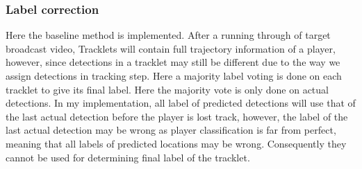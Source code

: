 \documentclass{article}
\begin{document}
\subsubsection{Label correction}
Here the baseline method is implemented.
After a running through of target broadcast video, Tracklets will contain full trajectory information of a player, however, since detections in a tracklet may still be different due to the way we assign detections in tracking step. Here a majority label voting is done on each tracklet to give its final label.
Here the majority vote is only done on actual detections. In my implementation, all label of predicted detections will use that of the last actual detection before the player is lost track, however, the label of the last actual detection may be wrong as player classification is far from perfect, meaning that all labels of predicted locations may be wrong. Consequently they cannot be used for determining final label of the tracklet.
\end{document}
